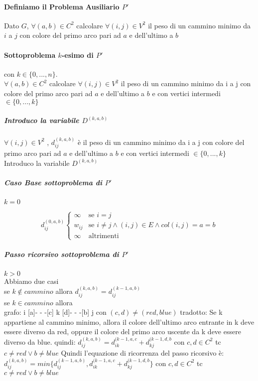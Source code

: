 \documentclass[12pt, a4paper, openany]{book}
\begin{document}
	\paragraph{Definiamo il Problema Ausiliario $P'$}
	Dato $G$, $\forall(a,b) \in C^2$ calcolare $\forall(i,j) \in V^2$ il peso di un cammino minimo da $i$ a $j$ con
	colore del primo arco pari ad $a$ e dell'ultimo a $b$

	\paragraph{Sottoproblema $k$-esimo di $P'$} con $k \in \{0,...,n\}$.
	\\$\forall(a,b) \in C^2$ calcolare $\forall(i,j) \in V^2$ il peso di un cammino minimo da i a j con
	colore del primo arco pari ad $a$ e dell'ultimo a $b$ e con vertici intermedi $\in \{0,...,k\}$\\
	\subparagraph{Introduco la variabile $D^{(k,a,b)}$}
	$\forall(i,j)\in V^2$ , $d^{(k,a,b)}_{ij}$ è il peso di un cammino minimo da i a j  con
	colore del primo arco pari ad $a$ e dell'ultimo a $b$ e con vertici intermedi $\in \{0,...,k\}$\\
	Introduco la variabile $D^{(k,a,b)}$
	\subparagraph{Caso Base sottoproblema di $P'$} $k = 0$

	\begin{equation*}
		d^{(0,a,b)}_{ij} \begin{cases}
			\infty & \text{se $i=j$}                                             \\
			w_{ij} & \text{se $i\neq j \land (i,j)\in E \land col(i,j) = a = b$} \\
			\infty & \text{altrimenti}
		\end{cases}
	\end{equation*}

	\subparagraph{Passo ricorsivo sottoproblema di $P'$} $k > 0$\\
	Abbiamo due casi\\
	se $k \notin cammino$ allora $d^{(k,a,b)}_{ij} = d^{(k-1,a,b)}_{ij}$\\
	se $k \in cammino$ allora \\
	grafo: i [a]- - -[c] k [d]- - -[b] j con $(c,d) \neq (red,blue)$
	tradotto: Se k appartiene al cammino minimo, allora il colore dell'ultimo arco entrante in k deve essere diverso da red, oppure il colore del primo arco uscente da k deve essere diverso da blue.
	quindi: $d^{(k,a,b)}_{ij} = d^{(k-1,a,c}_{ik} + d^{(k-1,d,b}_{kj}$ con $c,d \in C^2$ tc $c\neq red \vee b\neq blue$
	Quindi l'equazione di ricorrenza del passo ricorsivo è:\\
$d^{(k,a,b)}_{ij} = min\{d^{(k-1,a,b)}_{ij} ,d^{(k-1,a,c}_{ik} + d^{(k-1,d,b}_{kj}\}$ con $c,d \in C^2$ tc $c\neq red \vee b\neq blue$
\end{document}
